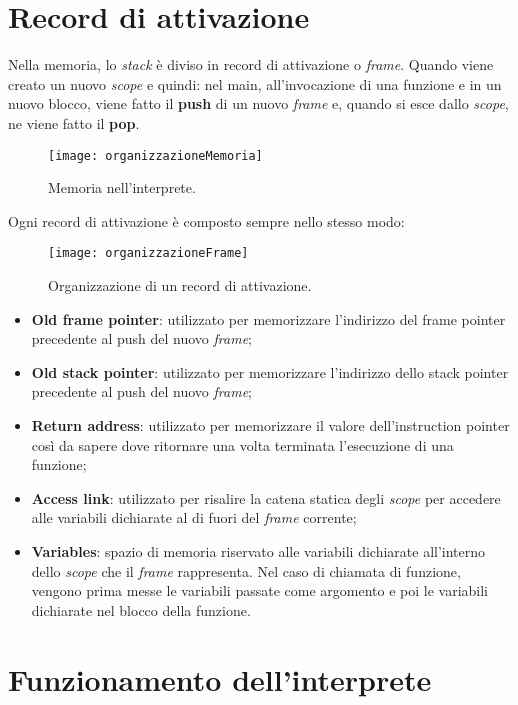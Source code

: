 \documentclass[../report.tex]{subfiles}
\begin{document}
\section{Record di attivazione}\label{s:record-di-attivazione}
Nella memoria, lo \textit{stack} \`e diviso in record di attivazione o \textit{frame}. Quando viene creato un nuovo \textit{scope} e quindi: nel main, all'invocazione di una funzione e in un nuovo blocco, viene fatto il \textbf{push} di un nuovo \textit{frame} e, quando si esce dallo \textit{scope}, ne viene fatto il \textbf{pop}.
\begin{figure}[H]
    \centering
    \texttt{[image: organizzazioneMemoria]}
    \caption{Memoria nell'interprete.}
\end{figure}
Ogni record di attivazione \`e composto sempre nello stesso modo:
\begin{figure}[H]
    \centering
    \texttt{[image: organizzazioneFrame]}
    \caption{Organizzazione di un record di attivazione.}
\end{figure}
\begin{itemize}
    \item \textbf{Old frame pointer}: utilizzato per memorizzare l'indirizzo del frame pointer precedente al push del nuovo \textit{frame};
    \item \textbf{Old stack pointer}: utilizzato per memorizzare l'indirizzo dello stack pointer precedente al push del nuovo \textit{frame};
    \item \textbf{Return address}: utilizzato per memorizzare il valore dell'instruction pointer cos\`i da sapere dove ritornare una volta terminata l'esecuzione di una funzione;
    \item \textbf{Access link}: utilizzato per risalire la catena statica degli \textit{scope} per accedere alle variabili dichiarate al di fuori del \textit{frame} corrente;
    \item \textbf{Variables}: spazio di memoria riservato alle variabili dichiarate all'interno dello \textit{scope} che il \textit{frame} rappresenta. Nel caso di chiamata di funzione, vengono prima messe le variabili passate come argomento e poi le variabili dichiarate nel blocco della funzione.
\end{itemize}

\section{Funzionamento dell'interprete}\label{s:funzionamento-interprete}
\end{document}
